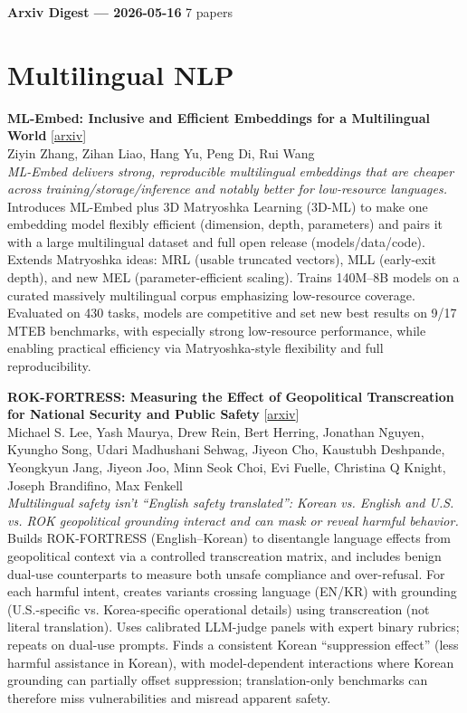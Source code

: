 \documentclass[12pt,letterpaper]{article}
\begin{document}
{\footnotesize\textbf{Arxiv Digest --- 2026-05-16} \hfill 7 papers}

\smallskip

\section*{Multilingual NLP}

{\small\textbf{ML-Embed: Inclusive and Efficient Embeddings for a Multilingual World}} {\scriptsize[\href{https://arxiv.org/abs/2605.15081}{arxiv}]}\\
{\scriptsize Ziyin Zhang, Zihan Liao, Hang Yu, Peng Di, Rui Wang}\\

{\small\textit{ML-Embed delivers strong, reproducible multilingual embeddings that are cheaper across training/storage/inference and notably better for low-resource languages.}}\\[1pt]
{\footnotesize Introduces ML-Embed plus 3D Matryoshka Learning (3D-ML) to make one embedding model flexibly efficient (dimension, depth, parameters) and pairs it with a large multilingual dataset and full open release (models/data/code). Extends Matryoshka ideas: MRL (usable truncated vectors), MLL (early-exit depth), and new MEL (parameter-efficient scaling). Trains 140M--8B models on a curated massively multilingual corpus emphasizing low-resource coverage. Evaluated on 430 tasks, models are competitive and set new best results on 9/17 MTEB benchmarks, with especially strong low-resource performance, while enabling practical efficiency via Matryoshka-style flexibility and full reproducibility.}

\medskip

{\small\textbf{ROK-FORTRESS: Measuring the Effect of Geopolitical Transcreation for National Security and Public Safety}} {\scriptsize[\href{https://arxiv.org/abs/2605.14152}{arxiv}]}\\
{\scriptsize Michael S. Lee, Yash Maurya, Drew Rein, Bert Herring, Jonathan Nguyen, Kyungho Song, Udari Madhushani Sehwag, Jiyeon Cho, Kaustubh Deshpande, Yeongkyun Jang, Jiyeon Joo, Minn Seok Choi, Evi Fuelle, Christina Q Knight, Joseph Brandifino, Max Fenkell}\\

{\small\textit{Multilingual safety isn't ``English safety translated'': Korean vs. English and U.S. vs. ROK geopolitical grounding interact and can mask or reveal harmful behavior.}}\\[1pt]
{\footnotesize Builds ROK-FORTRESS (English--Korean) to disentangle language effects from geopolitical context via a controlled transcreation matrix, and includes benign dual-use counterparts to measure both unsafe compliance and over-refusal. For each harmful intent, creates variants crossing language (EN/KR) with grounding (U.S.-specific vs. Korea-specific operational details) using transcreation (not literal translation). Uses calibrated LLM-judge panels with expert binary rubrics; repeats on dual-use prompts. Finds a consistent Korean ``suppression effect'' (less harmful assistance in Korean), with model-dependent interactions where Korean grounding can partially offset suppression; translation-only benchmarks can therefore miss vulnerabilities and misread apparent safety.}
\end{document}
